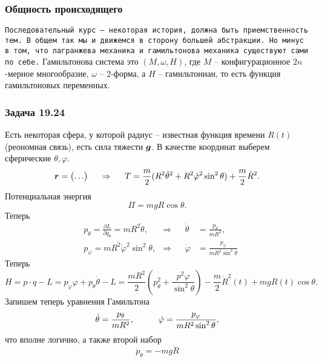 \subsubsection*{Общность происходящего}

\texttt{Последовательный курс -- некоторая история, должна быть приемственность тем. В общем так мы и движемся в сторону большей абстракции. Но минус в том, что лагранжева механика и гамильтонова механика существуют сами по себе.}  Гамильтонова система это $(M, \omega, H)$, где $M$ -- конфигурационное $2n$-мерное многообразие, $\omega$ -- 2-форма, а $H$ -- гамильтониан, то есть функция гамильтоновых переменных.


\subsubsection*{Задача 19.24}
Есть некоторая сфера, у которой радиус -- известная функция времени $R(t)$ (реономная связь), есть сила тяжести $\mbox{\boldmath $g$}$.
В качестве координат выберем сферические $\theta, \varphi$.  
\begin{equation*}
    \mbox{\boldmath $r$} = \begin{pmatrix}
        \ldots
    \end{pmatrix}
    \hspace{0.5cm} \Rightarrow \hspace{0.5cm}
    T = \frac{m}{2} (R^2 \dot{\theta}^2 + R^2 \dot{\varphi}^2 \sin^2 \theta )  + \frac{m}{2} \dot{R}^2.
\end{equation*}
Потенциальная энергия
\begin{equation*}
    \Pi = mg R \cos \theta.
\end{equation*}
Теперь 
\begin{align*}
    &p_\theta = \frac{\partial L}{\partial \dot{q}_\theta} = m R^2 \dot{\theta},
     &\Rightarrow 
    &&\dot{\theta} &= \frac{p_\theta}{m R^2}, \\
    &p_\varphi = m R^2 \dot{\varphi}^2 \sin^2 \theta,
     &\Rightarrow 
    &&\dot{\varphi} &= \frac{p_\varphi}{m R^2 \sin^2 \theta}
\end{align*}
Теперь
\begin{equation*}
    H = p \cdot q - L = p_\varphi \varphi + p_\theta \dot{\theta} - L = 
    \frac{m R^2}{2} \left(
        p^2_{\theta} + \frac{p^2 \varphi}{\sin^2 \theta}
    \right) - \frac{m}{2} \dot{R}^2 (t) + m g R(t) \cos \theta.
\end{equation*}
Запишем теперь уравнения Гамильтона
\begin{equation*}
    \dot{\theta} = \frac{p_\theta}{m R^2}, \hspace{1 cm}
    \dot{\varphi} = \frac{p_\varphi}{m R^2 \sin^2 \theta},
\end{equation*}
что вполне логично, а также второй набор
\begin{equation*}
    \dot{p}_\theta = - m g \dot{R} 
\end{equation*}

